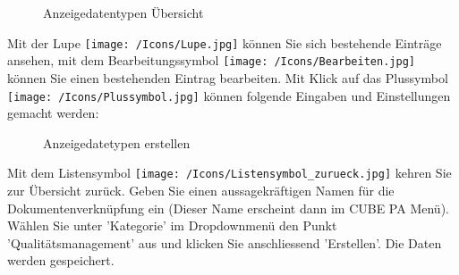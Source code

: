 \begin{figure}[H]
\caption{Anzeigedatentypen Übersicht}
\end{figure}

Mit der Lupe \texttt{[image: /Icons/Lupe.jpg]}  können Sie sich bestehende Einträge ansehen, mit dem Bearbeitungssymbol \texttt{[image: /Icons/Bearbeiten.jpg]}  können Sie einen bestehenden Eintrag bearbeiten. Mit Klick auf das Plussymbol \texttt{[image: /Icons/Plussymbol.jpg]}  können folgende Eingaben und Einstellungen gemacht werden:

\begin{figure}[H]
\caption{Anzeigedatetypen erstellen }
\end{figure}

Mit dem Listensymbol \texttt{[image: /Icons/Listensymbol\_zurueck.jpg]}  kehren Sie zur Übersicht zurück. Geben Sie einen aussagekräftigen Namen für die Dokumentenverknüpfung ein  (Dieser Name erscheint dann im CUBE PA Menü). Wählen Sie unter 'Kategorie'  im Dropdownmenü den Punkt 'Qualitätsmanagement' aus und klicken Sie anschliessend 'Erstellen'. Die Daten werden gespeichert.

